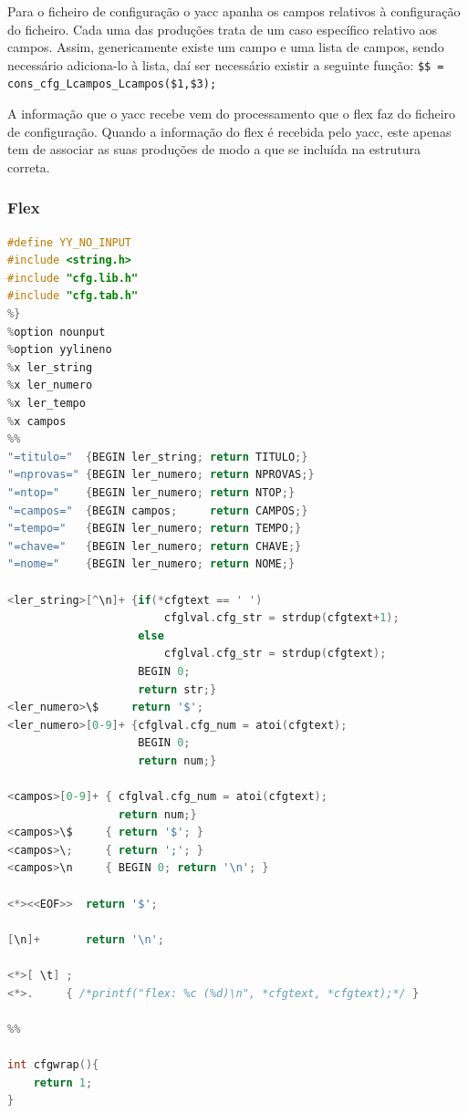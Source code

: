 \documentclass[11pt, a4paper, oneside]{article}
\begin{document}
Para o ficheiro de configuração o \textsf{yacc} apanha os campos relativos à configuração do ficheiro. Cada uma das produções trata de um caso específico relativo aos campos. Assim, genericamente existe um campo e uma lista de campos, sendo necessário adiciona-lo à lista, daí ser necessário existir a seguinte função: \texttt{\$\$ = cons\_cfg\_Lcampos\_Lcampos(\$1,\$3); }

A informação que o \textsf{yacc} recebe vem do processamento que o \textsf{flex} faz do ficheiro de configuração.
Quando a informação do \textsf{flex} é recebida pelo \textsf{yacc}, este apenas tem de associar as suas produções de modo a que se incluída na estrutura correta.

\newpage
\subsubsection{\textsf{Flex}}

\begin{lstlisting}[language=C, caption={Flex utilizado para o tratamento do ficheiro de configuração.}] 
%{
#define YY_NO_INPUT
#include <string.h>
#include "cfg.lib.h"
#include "cfg.tab.h"
%}
%option nounput
%option yylineno
%x ler_string
%x ler_numero
%x ler_tempo
%x campos
%%
"=titulo="  {BEGIN ler_string; return TITULO;}
"=nprovas=" {BEGIN ler_numero; return NPROVAS;}
"=ntop="    {BEGIN ler_numero; return NTOP;}
"=campos="  {BEGIN campos;     return CAMPOS;}
"=tempo="   {BEGIN ler_numero; return TEMPO;}
"=chave="   {BEGIN ler_numero; return CHAVE;}
"=nome="    {BEGIN ler_numero; return NOME;}

<ler_string>[^\n]+ {if(*cfgtext == ' ')
                        cfglval.cfg_str = strdup(cfgtext+1);
                    else
                        cfglval.cfg_str = strdup(cfgtext);
                    BEGIN 0;
                    return str;}
<ler_numero>\$     return '$';
<ler_numero>[0-9]+ {cfglval.cfg_num = atoi(cfgtext);
                    BEGIN 0;
                    return num;}

<campos>[0-9]+ { cfglval.cfg_num = atoi(cfgtext);
                 return num;}
<campos>\$     { return '$'; }
<campos>\;     { return ';'; }
<campos>\n     { BEGIN 0; return '\n'; }

<*><<EOF>>  return '$';

[\n]+       return '\n';

<*>[ \t] ;
<*>.     { /*printf("flex: %c (%d)\n", *cfgtext, *cfgtext);*/ }

%%

int cfgwrap(){
    return 1;
}
\end{lstlisting}
\end{document}
